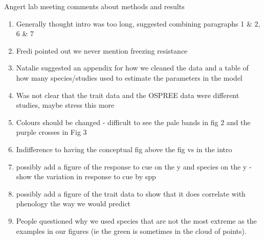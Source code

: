 \documentclass{article}
\begin{document}
Angert lab meeting comments about methods and results
\begin{enumerate}
\item Generally thought intro was too long, suggested combining paragraphs 1 \& 2, 6 \& 7
\item Fredi pointed out we never mention freezing resistance 
\item Natalie suggested an appendix for how we cleaned the data and a table of how many species/studies used to estimate the parameters in the model
\item Was not clear that the trait data and the OSPREE data were different studies, maybe stress this more
\item Colours should be changed - difficult to see the pale bands in fig 2 and the purple crosses in Fig 3
\item Indifference to having the conceptual fig above the fig vs in the intro
\item possibly add a figure of the response to cue on the y and species on the y - show the variation in response to cue by spp 
\item possibly add a figure of the trait data to show that it does correlate with phenology the way we would predict
\item People questioned why we used species that are not the most extreme as the examples in our figures (ie the green is sometimes in the cloud of points). 
\end{enumerate}


\end{document}
